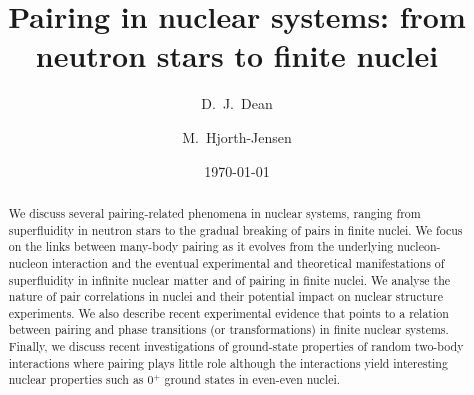 \documentclass[rmp,aps,floatfix]{revtex4}
\begin{document}
\title{Pairing in nuclear systems: from neutron stars to finite nuclei}
\author{D.~J.~Dean}
\author{M.~Hjorth-Jensen}
\date{\today}
\begin{abstract}

We discuss several pairing-related
phenomena in nuclear systems, ranging from superfluidity
in neutron stars to the gradual breaking of pairs in finite nuclei.
We focus on the links between
many-body pairing as it evolves from the underlying
nucleon-nucleon interaction
and the eventual experimental and theoretical manifestations
of superfluidity in infinite nuclear matter and
of pairing in finite nuclei.
We analyse the nature of pair correlations
in nuclei and their potential impact on nuclear structure
experiments.  We  also describe recent experimental evidence that
points to a relation between pairing and
phase transitions (or transformations) in finite nuclear
systems.  Finally, we discuss recent investigations of ground-state
properties of random two-body interactions where pairing plays little
role although
the interactions yield interesting nuclear properties such as 0$^+$
ground states in even-even nuclei.
   

\end{abstract}

\maketitle
\end{document}
